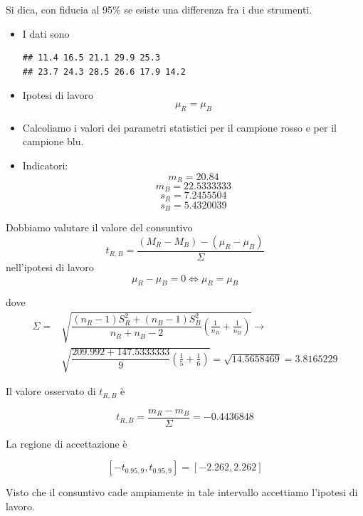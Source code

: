 \documentclass[onecolumn,12pt]{book}\usepackage[]{graphicx}\usepackage[]{color}
\makeatletter
\newenvironment{kframe}{%
 \def\at@end@of@kframe{}%
 \ifinner\ifhmode%
  \def\at@end@of@kframe{\end{minipage}}%
  \begin{minipage}{\columnwidth}%
 \fi\fi%
 \def\FrameCommand##1{\hskip\@totalleftmargin \hskip-\fboxsep
 \colorbox{shadecolor}{##1}\hskip-\fboxsep
     \hskip-\linewidth \hskip-\@totalleftmargin \hskip\columnwidth}%
 \MakeFramed {\advance\hsize-\width
   \@totalleftmargin\z@ \linewidth\hsize
   \@setminipage}}%
 {\par\unskip\endMakeFramed%
 \at@end@of@kframe}
\newenvironment{knitrout}{}{} %
\makeatother
\begin{document}
Si dica, con fiducia al 95\% se esiste una differenza fra i due strumenti.
\begin{itemize}
\item I dati sono
\begin{knitrout}
\color{fgcolor}\begin{kframe}
\begin{verbatim}
## 11.4 16.5 21.1 29.9 25.3
## 23.7 24.3 28.5 26.6 17.9 14.2
\end{verbatim}
\end{kframe}
\end{knitrout}
\item Ipotesi di lavoro \[\mu_R= \mu_B\]
  \item Calcoliamo i valori dei parametri statistici per il campione rosso e per il campione blu.
\item Indicatori:
\[m_R=20.84\]
\[m_B=22.5333333\]
 \[s_R=7.2455504\]
\[s_B=5.4320039\]
\end{itemize}

Dobbiamo valutare il valore del consuntivo
\[ t_{ R, B} =\frac{ (M_R-M_B) -(\mu_R-\mu_B)}{\Sigma }\]
nell'ipotesi di lavoro 
\[\mu_R-\mu_B= 0\Leftrightarrow \mu_R=\mu_B\]

dove
\[
\begin{aligned}
\Sigma =& \sqrt{\dfrac{(n_R-1) S_R^2+(n_B-1) S_B^2 }{n_R+n_B-2}  \left(\frac{1}{n_R} +\frac{1}{n_B}\right)}\rightarrow  \\
&\sqrt{\dfrac{209.992+147.5333333 }{9}   \left(\frac{1}{5} +\frac{1}{6}\right)}= 
\sqrt{14.5658469} = 3.8165229
\end{aligned}
\] 

Il valore osservato di $t_{R,B}$ è

\[t_{ R,B} = \frac{m_R-m_B}{\Sigma}  =\ensuremath{-0.4436848} \]


La regione di accettazione \`e

\[[-t_{ 0.95, 9} , t_{0.95, 9} ] = [-2.262, 2.262]\]

Visto che il consuntivo  cade ampiamente in tale intervallo accettiamo l'ipotesi di lavoro.
\end{document}
